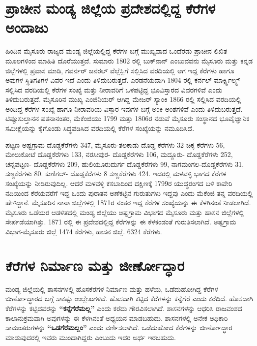 \section{ಪ್ರಾಚೀನ ಮಂಡ್ಯ ಜಿಲ್ಲೆಯ ಪ್ರದೇಶದಲ್ಲಿದ್ದ ಕೆರೆಗಳ ಅಂದಾಜು}

ಹಿಂದಿನ ಮೈಸೂರು ರಾಜ್ಯದ ಮಂಡ್ಯ ಜಿಲ್ಲೆಯಲ್ಲಿದ್ದ ಕೆರೆಗಳ ಬಗ್ಗೆ ಮುಖ್ಯವಾದ ಒಂದೆರಡು ಪ್ರಾಚೀನ ಲಿಖಿತ ಮೂಲಗಳಿಂದ ಮಾಹಿತಿ ದೊರೆಯುತ್ತದೆ. ಸುಮಾರು 1802 ರಲ್ಲಿ ಬುಕ್​ನಾನ್​ ಎಂಬುವವನು ಮೈಸೂರು ಮತ್ತು ಕನ್ನಡ ಜಿಲ್ಲೆಗಳಲ್ಲಿ ಪ್ರವಾಸ ಮಾಡಿ, ಗವರ್ನರ್​ ಜನರಲ್​ ವೆಲ್ಲೆಸ್ಲಿಗೆ ಸಲ್ಲಿಸಿದ ವರದಿಯಲ್ಲಿ ಆಗ ಇದ್ದ ಕೆರೆಗಳು ಹಾಗೂ ಅವುಗಳ ಸ್ಥಿತಿಗತಿಗಳ ವಿವರ ಇದೆ ಎಂದು ತಿಳಿದುಬರುತ್ತದೆ. ಎರಡನೆಯದಾಗಿ 1804 ರಲ್ಲಿ ಕರ್ನಲ್​ ಮಾರ್ಕ್ಸ್ವಿಲ್ಕ್ಸ್ ಸಲ್ಲಿಸಿದ ವರದಿಯಲ್ಲಿ ಕೆರೆಗಳ ಸಂಖ್ಯೆ ಮತ್ತು ನೀರಾವರಿಗೆ ಒಳಪಟ್ಟಿದ್ದ ಭೂವಿಸ್ತಾರದ ವಿವರಗಳಿವೆ ಎಂದು ತಿಳಿದುಬರುತ್ತದೆ. ಮೈಸೂರಿನ ಮುಖ್ಯ ಎಂಜಿನಿಯರ್​ ಆಗಿದ್ದ ಮೇಜರ್​ ಸ್ಯಾಂಕಿ 1866 ರಲ್ಲಿ ಸಲ್ಲಿಸಿದ ವರದಿಯಲ್ಲಿ ಅಂದಿದ್ದ ಕೆರೆಗಳ ಸಂಖ್ಯೆ ಹಾಗೂ ನೀರಾವರಿಯ ವಿಸ್ತಾರ ಇವುಗಳ ಬಗ್ಗೆ ಅಂಕಿ ಅಂಶಗಳಿವೆ ಎಂದು ತಿಳಿದುಬರುತ್ತದೆ. ಟಿಪ್ಪೂಸುಲ್ತಾನನ ಪತನಾನಂತರ, ಮೆಕೆಂಜಿಯು 1799 ಮತ್ತು 1806ರ ನಡುವೆ ಮೈಸೂರು ಸಂಸ್ಥಾನದ ಭೂವೈಜ್ಞಾನಿಕ ಸಮೀಕ್ಷೆಯನ್ನು ಕೈಗೊಂಡು ಸಿದ್ಧಪಡಿಸಿದ ವರದಿಯಲ್ಲಿ ಕೆರೆಗಳ ಸಂಖ್ಯೆಯನ್ನು ನಮೂದಿಸಿದೆ.

ಪಟ್ಟಣ ಅಷ್ಟಗ್ರಾಮ  ದೊಡ್ಡಕೆರೆಗಳು 347, ಮೈಸೂರು-ತಲಕಾಡು ದೊಡ್ಡ ಕೆರೆಗಳು 32 ಚಿಕ್ಕ ಕೆರೆಗಳು 56, ಮೇಲುಕೋಟೆ  ದೊಡ್ಡಕೆರೆಗಳು 133, ನರಸೀಪುರ- ದೊಡ್ಡಕೆರೆಗಳು 106, ಮದ್ದೂರು- ದೊಡ್ಡಕೆರೆಗಳು 252, ಚನ್ನಪಟ್ಟಣ- ದೊಡ್ಡಕೆರೆಗಳು 209, ಹುಲಿಯೂರುದುರ್ಗ ದೊಡ್ಡಕೆರೆಗಳು 99, ನಾಗಮಂಗಲ-ದೊಡ್ಡಕೆರೆಗಳು 31, ಸಣ್ಣಕೆರೆಗಳು 80. ಕುಣಿಗಲ್​- ದೊಡ್ಡಕೆರೆಗಳು 8 ಸಣ್ಣಕೆರೆಗಳು 424. ಇದರಲ್ಲಿ ಮಳವಳ್ಳಿ ಭಾಗದ ಕೆರೆಗಳ ಸಂಖ್ಯೆಯನ್ನು ನೀಡಿರುವುದಿಲ್ಲ. ಆದರೆ ಮಳವಳ್ಳಿ ಕಸಬಾದಿಂದ ದಕ್ಷಿಣಕ್ಕೆ 1799ರ ಯುದ್ಧರಂಗದ ಬಳಿ ಕಾವೇರಿ ನದಿಯಿಂದ ಕೆರೆಯವರೆಗೆ ಇದ್ದ ಒಂದು ಪುರಾತನ ಅಣೆಕಟ್ಟಿನ ಗುರುತುಗಳು ಇದ್ದವು ಎಂದು ಮೆಕೆಂಜಿ ತನ್ನ ವರದಿಯಲ್ಲಿ ಹೇಳಿದ್ದಾನೆ. ಮೈಸೂರಿನ ನಾನಾ ಜಿಲ್ಲೆಗಳಲ್ಲಿ 1871ರ ನಂತರ ಇದ್ದ ಕೆರೆಗಳ ಸಂಖ್ಯೆಯನ್ನು ಈ ಕೆಳಗಿನಂತೆ ನೀಡಲಾಗಿದೆ. ಮೈಸೂರು ಒಡೆಯರ ಆಡಳಿತದಲ್ಲಿ ಮಂಡ್ಯ ಜಿಲ್ಲೆಯು ಅಷ್ಟಗ್ರಾಮ ವಿಭಾಗದ ಮೈಸೂರು ಮತ್ತು ಹಾಸನ ಜಿಲ್ಲೆಗಳಲ್ಲಿ ಸೇರ್ಪಡೆಯಾಗಿತ್ತು. 1871 ರಲ್ಲಿ ಈ ಪ್ರದೇಶದಲ್ಲಿದ್ದ ಕೆರೆಗಳನ್ನು ಈ ಕೆಳಕಂಡಂತೆ ಗುರುತಿಸಲಾಗಿದೆ. ಅಷ್ಟಗ್ರಾಮ ವಿಭಾಗ-ಮೈಸೂರು ಜಿಲ್ಲೆ 1474 ಕೆರೆಗಳು, ಹಾಸನ ಜಿಲ್ಲೆ. 6324 ಕೆರೆಗಳು.


\section{ಕೆರೆಗಳ ನಿರ್ಮಾಣ ಮತ್ತು ಜೀರ್ಣೋದ್ಧಾರ}

ಮಂಡ್ಯ ಜಿಲ್ಲೆಯಲ್ಲಿ ಶಾಸನಗಳಲ್ಲಿ ಹೊಸಕೆರೆಗಳ ನಿರ್ಮಾಣ ಮತ್ತು ಹಳೆಯ, ಒಡೆದುಹೋಗಿದ್ದ ಕೆರೆಗಳ ಜೀರ್ಣೋದ್ಧಾರದ ಬಗ್ಗೆ ಸಾಕಷ್ಟು ಉಲ್ಲೇಖಗಳಿವೆ. ಹೊಸದಾಗಿ ಕಟ್ಟಿದ ಕೆರೆಗಳನ್ನು ಕನ್ನೆಗೆರೆ ಎಂದು ಕರೆದಿದೆ. ಹೊಸದಾಗಿ ಕೆರೆಗಳನ್ನು ಕಟ್ಟಿದವರನ್ನು \textbf{“ಕನ್ನೆಗೆರೆಮಲ್ಲ”} ಎಂದು ಕರೆದು ಗೌರವಿಸಲಾಗಿದೆ. ಶಾಸನಗಳನ್ನು ಆಧರಿಸಿ ರಾಜವಂಶದ ಕಾಲಾನುಕ್ರಮವಾಗಿ ಅವುಗಳನ್ನು ಈ ಕೆಳಗಿನಂತೆ ಅಧ್ಯಯನ ಮಾಡಬಹುದು. ಶಾಸನಗಳಲ್ಲಿ ಅನೇಕ ಅಧಿಕಾರಿ ಸಾಮಂತರುಗಳನ್ನು \textbf{“ಒಡಗೆರೆಮಲ್ಲಂ”} ಎಂದು ವರ್ಣಿಸಲಾಗಿದೆ. ಒಡೆದುಹೋದ ಕೆರೆಗಳನ್ನು ಜೀರ್ಣೋದ್ಧಾರ ಮಾಡುವುದರಲ್ಲಿ ಇವರು ಮುಂದಾಗಿದ್ದರು ಎಂಬುದು ಇದರ ಅರ್ಥ ಇರಬಹುದು.

